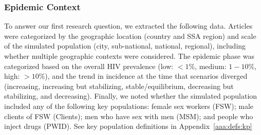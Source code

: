 \subsubsection{Epidemic Context}
\label{sss:meth:context}
To answer our first research question, we extracted the following data.
Articles were categorized by the geographic location (country and SSA region)
and scale of the simulated population (city, sub-national, national, regional),
including whether multiple geographic contexts were considered.
The epidemic phase was categorized based on
the overall HIV prevalence (low: $<1\%$, medium: $1-10\%$, high: $>10\%$),
and the trend in incidence at the time that scenarios diverged
(increasing, increasing but stabilizing, stable/equilibrium,
decreasing but stabilizing, and decreasing).
Finally, we noted whether the simulated population
included any of the following key populations:
female sex workers (FSW);
male clients of FSW (Clients);
men who have sex with men (MSM); and
people who inject drugs (PWID).
See key population definitions in Appendix~\ref{aaa:defs:kp}
